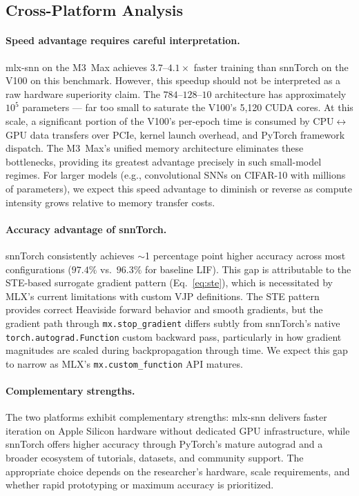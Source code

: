 \documentclass[11pt]{article}
\begin{document}
\subsection{Cross-Platform Analysis}

\paragraph{Speed advantage requires careful interpretation.}
mlx-snn on the M3~Max achieves $3.7$--$4.1\times$ faster training than snnTorch on the V100 on this benchmark. However, this speedup should not be interpreted as a raw hardware superiority claim. The $784$--$128$--$10$ architecture has approximately $10^5$ parameters --- far too small to saturate the V100's 5,120 CUDA cores. At this scale, a significant portion of the V100's per-epoch time is consumed by CPU$\leftrightarrow$GPU data transfers over PCIe, kernel launch overhead, and PyTorch framework dispatch. The M3~Max's unified memory architecture eliminates these bottlenecks, providing its greatest advantage precisely in such small-model regimes. For larger models (e.g., convolutional SNNs on CIFAR-10 with millions of parameters), we expect this speed advantage to diminish or reverse as compute intensity grows relative to memory transfer costs.

\paragraph{Accuracy advantage of snnTorch.}
snnTorch consistently achieves $\sim$1 percentage point higher accuracy across most configurations ($97.4\%$ vs.\ $96.3\%$ for baseline LIF). This gap is attributable to the STE-based surrogate gradient pattern (Eq.~\ref{eq:ste}), which is necessitated by MLX's current limitations with custom VJP definitions. The STE pattern provides correct Heaviside forward behavior and smooth gradients, but the gradient path through \texttt{mx.stop\_gradient} differs subtly from snnTorch's native \texttt{torch.autograd.Function} custom backward pass, particularly in how gradient magnitudes are scaled during backpropagation through time. We expect this gap to narrow as MLX's \texttt{mx.custom\_function} API matures.

\paragraph{Complementary strengths.}
The two platforms exhibit complementary strengths: mlx-snn delivers faster iteration on Apple Silicon hardware without dedicated GPU infrastructure, while snnTorch offers higher accuracy through PyTorch's mature autograd and a broader ecosystem of tutorials, datasets, and community support. The appropriate choice depends on the researcher's hardware, scale requirements, and whether rapid prototyping or maximum accuracy is prioritized.
\end{document}
